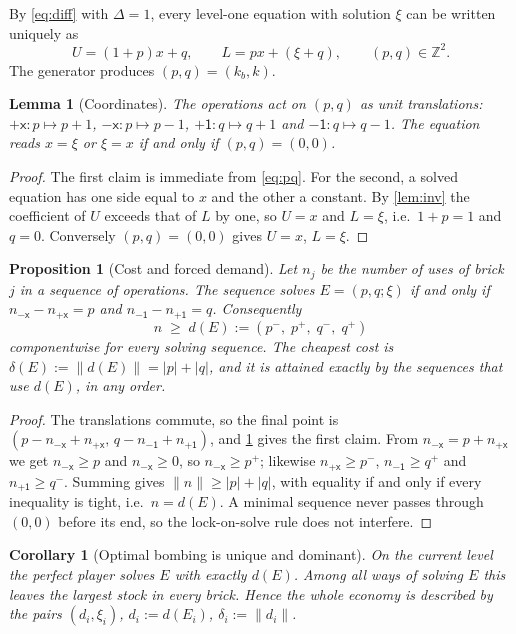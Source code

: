 \documentclass[11pt,a4paper]{article}
\newtheorem{lemma}[theorem]{Lemma}
\newtheorem{proposition}[theorem]{Proposition}
\newtheorem{corollary}[theorem]{Corollary}
\theoremstyle{definition}
\theoremstyle{remark}
\newcommand{\Z}{\mathbb{Z}}
\newcommand{\pX}{\ensuremath{\mathord{+}\mathsf{x}}}
\newcommand{\mX}{\ensuremath{\mathord{-}\mathsf{x}}}
\newcommand{\pU}{\ensuremath{\mathord{+}\mathsf{1}}}
\newcommand{\mU}{\ensuremath{\mathord{-}\mathsf{1}}}
\newcommand{\abs}[1]{\lvert #1\rvert}
\newcommand{\norm}[1]{\lVert #1\rVert}
\newcommand{\pos}[1]{{#1}^{+}}
\begin{document}
By \eqref{eq:diff} with $\Delta=1$, every level-one equation with solution $\xi$ can be
written uniquely as
\begin{equation}\label{eq:pq}
U=(1+p)x+q,\qquad L=px+(\xi+q),\qquad (p,q)\in\Z^2 .
\end{equation}
The generator produces $(p,q)=(k_b,k)$.

\begin{lemma}[Coordinates]\label{lem:coord}
The operations act on $(p,q)$ as unit translations:
$\pX\colon p\mapsto p+1$, $\mX\colon p\mapsto p-1$, $\pU\colon q\mapsto q+1$ and
$\mU\colon q\mapsto q-1$. The equation reads $x=\xi$ or $\xi=x$ if and only if
$(p,q)=(0,0)$.
\end{lemma}
\begin{proof}
The first claim is immediate from \eqref{eq:pq}. For the second, a solved equation has
one side equal to $x$ and the other a constant. By \cref{lem:inv} the coefficient of $U$
exceeds that of $L$ by one, so $U=x$ and $L=\xi$, i.e.\ $1+p=1$ and $q=0$. Conversely
$(p,q)=(0,0)$ gives $U=x$, $L=\xi$.
\end{proof}

\begin{proposition}[Cost and forced demand]\label{prop:cost}
Let $n_j$ be the number of uses of brick $j$ in a sequence of operations. The sequence
solves $E=(p,q;\xi)$ if and only if $n_{\mX}-n_{\pX}=p$ and $n_{\mU}-n_{\pU}=q$.
Consequently
\[
n\;\ge\;d(E):=(p^-,\;\pos p,\;q^-,\;\pos q)
\]
componentwise for every solving sequence. The cheapest cost is
$\delta(E):=\norm{d(E)}=\abs p+\abs q$, and it is attained exactly by the sequences
that use $d(E)$, in any order.
\end{proposition}
\begin{proof}
The translations commute, so the final point is
$(p-n_{\mX}+n_{\pX},\,q-n_{\mU}+n_{\pU})$, and \cref{lem:coord} gives the first claim.
From $n_{\mX}=p+n_{\pX}$ we get $n_{\mX}\ge p$ and $n_{\mX}\ge0$, so
$n_{\mX}\ge\pos p$; likewise $n_{\pX}\ge p^-$, $n_{\mU}\ge\pos q$ and $n_{\pU}\ge q^-$.
Summing gives $\norm n\ge\abs p+\abs q$, with equality if and only if every inequality is
tight, i.e.\ $n=d(E)$. A minimal sequence never passes through $(0,0)$ before its end,
so the lock-on-solve rule does not interfere.
\end{proof}

\begin{corollary}[Optimal bombing is unique and dominant]\label{cor:dominant}
On the current level the perfect player solves $E$ with exactly $d(E)$. Among all ways of
solving $E$ this leaves the largest stock in every brick. Hence the whole economy is
described by the pairs $(d_i,\xi_i)$, $d_i:=d(E_i)$, $\delta_i:=\norm{d_i}$.
\end{corollary}
\end{document}

